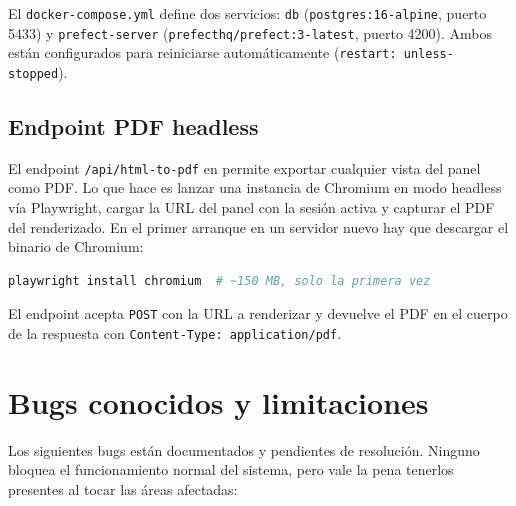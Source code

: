 \documentclass[12pt, a4paper]{article}
\begin{document}
El \texttt{docker-compose.yml} define dos servicios: \texttt{db} (\texttt{postgres:16-alpine}, puerto 5433) y \texttt{prefect-server} (\texttt{prefecthq/prefect:3-latest}, puerto 4200). Ambos están configurados para reiniciarse automáticamente (\texttt{restart: unless-stopped}).

\subsection{Endpoint PDF headless}

El endpoint \texttt{/api/html-to-pdf} en  permite exportar cualquier vista del panel como PDF. Lo que hace es lanzar una instancia de Chromium en modo headless vía Playwright, cargar la URL del panel con la sesión activa y capturar el PDF del renderizado. En el primer arranque en un servidor nuevo hay que descargar el binario de Chromium:

\begin{lstlisting}[language=bash]
playwright install chromium  # ~150 MB, solo la primera vez
\end{lstlisting}

El endpoint acepta \texttt{POST} con la URL a renderizar y devuelve el PDF en el cuerpo de la respuesta con \texttt{Content-Type: application/pdf}.

\section{Bugs conocidos y limitaciones}
\label{sec:bugs}

Los siguientes bugs están documentados y pendientes de resolución. Ninguno bloquea el funcionamiento normal del sistema, pero vale la pena tenerlos presentes al tocar las áreas afectadas:
\end{document}
